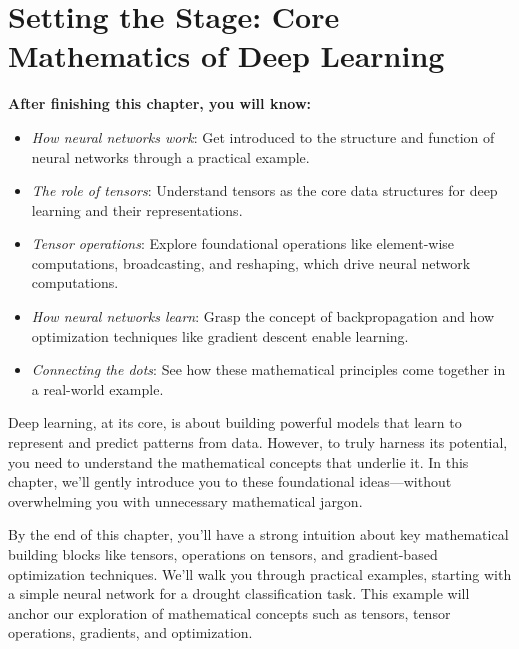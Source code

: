 \chapter{Setting the Stage: Core Mathematics of Deep Learning}
\begin{mdframed}[linewidth=1pt, linecolor=gray, backgroundcolor=gray!5] \vspace{0.2cm} \textbf{\Large After finishing this chapter, you will know:} \vspace{0.1cm}

\begin{itemize}[label=\textbf{\textendash}, leftmargin=1.5em, itemsep=0.5em, labelsep=0.5em] \item \textit{How neural networks work}: Get introduced to the structure and function of neural networks through a practical example. \item \textit{The role of tensors}: Understand tensors as the core data structures for deep learning and their representations. \item \textit{Tensor operations}: Explore foundational operations like element-wise computations, broadcasting, and reshaping, which drive neural network computations. \item \textit{How neural networks learn}: Grasp the concept of backpropagation and how optimization techniques like gradient descent enable learning. \item \textit{Connecting the dots}: See how these mathematical principles come together in a real-world example. \end{itemize} \vspace{0.2cm} \end{mdframed}


Deep learning, at its core, is about building powerful models that learn to represent and predict patterns from data. However, to truly harness its potential, you need to understand the mathematical concepts that underlie it. In this chapter, we’ll gently introduce you to these foundational ideas—without overwhelming you with unnecessary mathematical jargon.

By the end of this chapter, you’ll have a strong intuition about key mathematical building blocks like tensors, operations on tensors, and gradient-based optimization techniques. We’ll walk you through practical examples, starting with a simple neural network for a drought classification task. This example will anchor our exploration of mathematical concepts such as tensors, tensor operations, gradients, and optimization.

